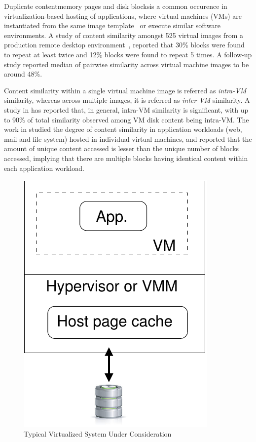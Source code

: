 
Duplicate content\textemdash{}memory pages and disk blocks\textemdash{}is a common
occurence in virtualization-based hosting of applications, where
virtual machines (VMs) are instantiated from the same image 
template~\cite{effectiveness} or execute similar software environments. 
A study of content similarity amongst 525
virtual images from a production remote desktop environment~\cite{similarity}, 
reported that
30\% blocks were found to repeat at least twice and 12\% blocks were
found to repeat 5 times. A follow-up study\cite{vdn}
reported median of pairwise similarity across
virtual machine images to be around 48\%.

Content similarity within a single virtual machine image is referred
as \textit{intra-VM} similarity, whereas across multiple images, it is
referred as \textit{inter-VM} similarity.
A study in \cite{intra-higherthan-inter} has reported that, in general,
intra-VM similarity is significant, with up to 90\% of total similarity 
observed among VM disk content being intra-VM.
The work in \cite{iodedup} studied the degree of content similarity
in application workloads (web, mail and file system) hosted in 
individual virtual machines,
and reported that the amount of unique content accessed is lesser
than the unique number of blocks accessed, implying that there are multiple 
blocks having identical content within each application workload.

\begin{figure}[t]
\centering
\includegraphics[scale=0.65]{confided-figures/main/system-under-considerat.pdf}
\vspace{-0.15in}
\caption{Typical Virtualized System Under Consideration}
\label{fig:system-under-considerat}
\end{figure}


